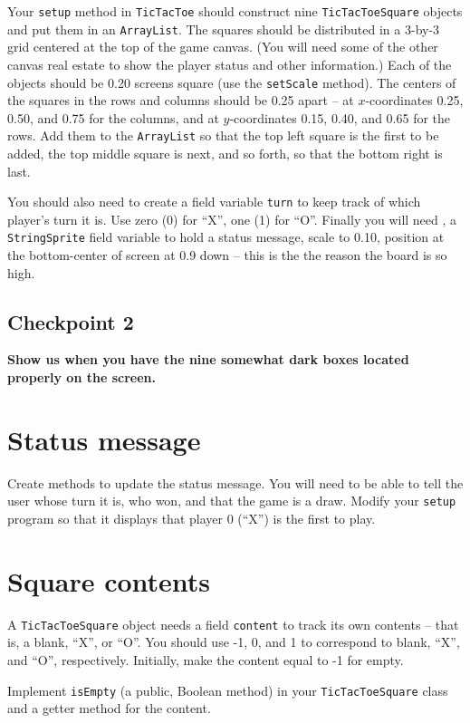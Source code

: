 \documentclass[12pt]{article}
\newcommand{\code}{\texttt}
\begin{document}
Your \code{setup} method in \code{TicTacToe}
should construct nine \code{TicTacToeSquare} objects
and put them in an \code{ArrayList}.
The squares should be distributed in a 3-by-3
grid centered at the top of the game canvas.
(You will need some of the other canvas real estate
to show the player status and other information.)
Each of the objects should be 0.20 screens square
(use the \code{setScale} method).
The centers of the squares in the rows and columns
should be 0.25 apart --
at $x$-coordinates 0.25, 0.50, and 0.75 for the columns,
and at $y$-coordinates 0.15, 0.40, and 0.65 for the rows.
Add them to the \code{ArrayList}
so that the top left square is the first to be added,
the top middle square is next, and so forth,
so that the bottom right is last.

You should also need to create a field variable \code{turn} to keep track
of which player's turn it is.
Use zero (0) for ``X'', one (1) for ``O''.
Finally you will need , a \code{StringSprite} field variable to hold a
status message, scale to 0.10, position at the bottom-center of screen
at 0.9 down -- this is the the reason the board is so high.

\subsection*{Checkpoint 2}
{\bf
Show us when you have the nine somewhat dark boxes
located properly on the screen.
}

\section*{Status message}

Create methods to update the status message.
You will need to be able to tell the user whose turn it is,
who won, and that the game is a draw.
Modify your \code{setup} program
so that it displays that player 0 (``X'') is the first to play.

\section*{Square contents}

A \code{TicTacToeSquare} object needs a field \code{content}
to track its own contents --
that is, a blank,  ``X'', or ``O''.
You should use -1, 0, and 1 to correspond
to blank, ``X'', and ``O'', respectively.
Initially, make the content equal to -1 for empty.

Implement \code{isEmpty} (a public, Boolean method)
in your \code{TicTacToeSquare} class and a getter
method for the content.
\end{document}

